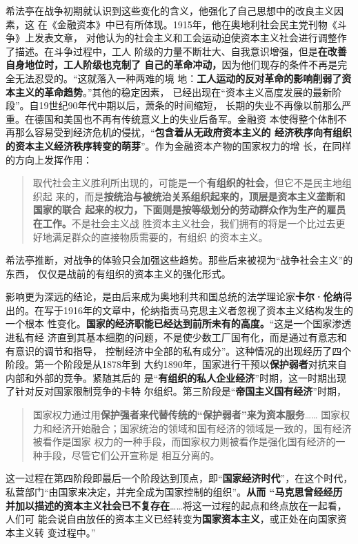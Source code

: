 希法亭在战争初期就认识到这些变化的含义，他强化了自己思想中的改良主义因素，这
在《金融资本》中已有所体现。1915年，他在奥地利社会民主党刊物《斗争》上发表文章，
对他认为的社会主义和工会运动迫使资本主义社会进行调整作了描述。在斗争过程中，工人
阶级的力量不断壮大、自我意识增强，但是\textbf{在改善自身地位时，工人阶级也克制了
自己的革命冲动，}因为他们现存的条件不再是完全无法忍受的。“这就落入一种两难的境
地：\textbf{工人运动的反对革命的影响削弱了资本主义的革命趋势}。”其他的稳定因素，
已经出现在“资本主义高度发展的最新阶段”。自19世纪90年代中期以后，萧条的时间缩短，
长期的失业不再像以前那么严重。在德国和美国也不再有传统意义上的失业后备军。金融资
本使得整个体制不再那么容易受到经济危机的侵扰，“\textbf{包含着从无政府资本主义的
经济秩序向有组织的资本主义经济秩序转变的萌芽}”。作为金融资本产物的国家权力的增
长，在同样的方向上发挥作用：
\begin{quotation}
  取代社会主义胜利所出现的，可能是一个\textbf{有组织的社会}，但它不是民主地组织起
  来的，而是\textbf{按统治与被统治关系组织起来的，顶层是资本主义垄断和国家的联合
    起来的权力，下面则是按等级划分的劳动群众作为生产的雇员在工作。}不是社会主义战
  胜资本主义社会，我们拥有的将是一个比过去更好地满足群众的直接物质需要的，有组织
  的资本主义。
\end{quotation}

希法亭推断，对战争的体验只会加强这些趋势。那些后来被视为“战争社会主义”的东西，
仅仅是战前的有组织的资本主义的强化形式。

影响更为深远的结论，是由后来成为奥地利共和国总统的法学理论家\textbf{卡尔·伦纳}得
出的。在写于1916年的文章中，伦纳指责马克思主义者忽视了资本主义结构发生的一个根本
性变化。\textbf{国家的经济职能已经达到前所未有的高度。}“这是一个国家渗透进私有经
济直到其基本细胞的问题，不是使少数工厂国有化，而是通过有意志和有意识的调节和指导，
控制经济中全部的私有成分”。这种情况的出现经历了四个阶段。第一个阶段是从1878年到
大约1890年，国家进行干预以\textbf{保护弱者}对抗来自内部和外部的竞争。紧随其后的
是“\textbf{有组织的私人企业经济}”时期，这一时期出现了针对反对国家限制竞争的卡特
尔组织。第三阶段是“\textbf{帝国主义国有经济}”时期，
\begin{quotation}
  国家权力通过用\textbf{保护强者来代替传统的“保护弱者”来为资本服务}…… 国家权
  力和经济开始融合；国家统治的领域和国有经济的领域是一致的，国有经济被看作是国家
  权力的一种手段，而国家权力则被看作是强化国有经济的一种手段，尽管它们公开宣称是
  相互分离的。
\end{quotation}

这一过程在第四阶段即最后一个阶段达到顶点，即“\textbf{国家经济时代}”，在这个时代，
私营部门“由国家来决定，并完全成为国家控制的组织”。\textbf{从而 “马克思曾经经历
  并加以描述的资本主义社会已不复存在}……将这一过程的起点和终点放在一起看，人们可
能会说自由放任的资本主义已经转变为\textbf{国家资本主义}，或正处在向国家资本主义转
变过程中。”

